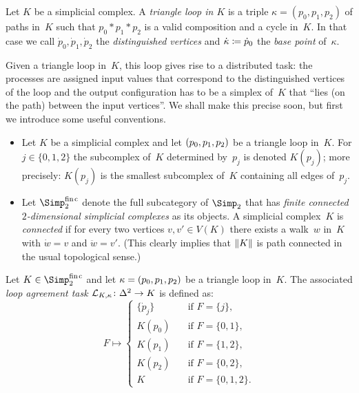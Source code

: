\begin{thDef}
    Let $K$ be a simplicial complex.
    A \emph{triangle loop in $K$} is a triple $\kappa = (p_0,p_1,p_2)$ of paths
    in~$K$ such that $p_0\ast p_1\ast p_2$ is a valid composition and a cycle
    in~$K$. In that case we call $\dot{p}_0,\dot{p}_1,\dot{p}_2$ the
    \emph{distinguished vertices} and $\dot\kappa \coloneqq \dot{p}_0$ the
    \emph{base point} of~$\kappa$.
\end{thDef}

Given a triangle loop in~$K$, this loop gives rise to a distributed task:
the processes are assigned input values that correspond to the distinguished
vertices of the loop and the output configuration has to be a simplex of~$K$
that \enquote{lies (on the path) between the input vertices}. We shall make this
precise soon, but first we introduce some useful conventions.

\pagebreak[4] %
\begin{thConvention}\hfill
    \begin{itemize}
        \item
            Let $K$ be a simplicial complex and let $(p_0,p_1,p_2)$ be a triangle loop
            in~$K$. For $j\in\{0,1,2\}$ the subcomplex of~$K$ determined
            by~$p_j$ is denoted $K(p_j)$; more precisely: $K(p_j)$ is the
            smallest subcomplex of~$K$ containing all edges of~$p_j$.
            
        \item
            Let $\finSimp$ denote the full subcategory of $\Simp_2$ that has
            \emph{finite connected $2$-dimensional simplicial complexes} as its
            objects. A simplicial complex~$K$ is \emph{connected} if for
            every two vertices $v,v'\in V(K)$ there exists a walk~$w$ in~$K$
            with $\dot w = v$ and $\ddot w = v'$. (This clearly implies that
            $\lVert K\rVert$ is path connected in the usual topological sense.)
    \end{itemize}
\end{thConvention}

\begin{thDef}
    Let $K\in\finSimp$ and let $\kappa = (p_0,p_1,p_2)$ be a triangle loop in~$K$. The
    associated \emph{loop agreement task $\mathcal{L}_{K,\kappa}\colon\Delta^2 \to K$}
    is defined as:
    \[
        F \mapsto \begin{cases}
            \{\dot{p}_j\} &\quad \text{if } F = \{j\},   \\
            K(p_0)        &\quad \text{if } F = \{0,1\}, \\
            K(p_1)        &\quad \text{if } F = \{1,2\}, \\
            K(p_2)        &\quad \text{if } F = \{0,2\}, \\
            K             &\quad \text{if } F = \{0,1,2\}
        . \end{cases}
    \]
\end{thDef}
%

